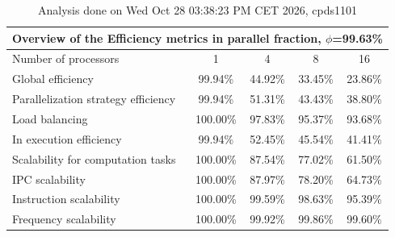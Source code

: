 \begin{table}[h]
\begin{center}
\begin{tabular}{|l|c|c|c|c|}
\hline
\multicolumn{5}{|c|}{Overview of the Efficiency metrics in parallel fraction, $\phi$=99.63\%} \\
\hline
\hline
Number of processors & 1 & 4 & 8 & 16 \\
\hline
\hline
Global efficiency                      &     99.94\% &     44.92\% &     33.45\% &     23.86\% \\
\hline
\hline
Parallelization strategy efficiency &     99.94\% &     51.31\% &     43.43\% &     38.80\% \\
\hline
Load balancing                   &    100.00\% &     97.83\% &     95.37\% &     93.68\% \\
In execution efficiency          &     99.94\% &     52.45\% &     45.54\% &     41.41\% \\
\hline
\hline
Scalability for computation tasks   &    100.00\% &     87.54\% &     77.02\% &     61.50\% \\
\hline
IPC scalability                  &    100.00\% &     87.97\% &     78.20\% &     64.73\% \\
Instruction scalability          &    100.00\% &     99.59\% &     98.63\% &     95.39\% \\
Frequency scalability            &    100.00\% &     99.92\% &     99.86\% &     99.60\% \\
\hline
\end{tabular}
\end{center}
\caption{ Analysis done on Wed Oct 28 03:38:23 PM CET 2026, cpds1101}
\end{table}
